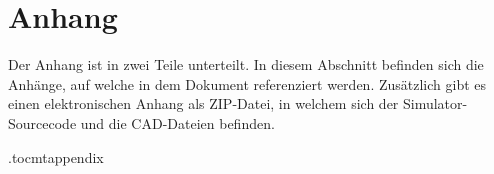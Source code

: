\documentclass[../main.tex]{subfiles}
\begin{document}
\newpage
\appendix
\chapter*{Anhang}

Der Anhang ist in zwei Teile unterteilt.
In diesem Abschnitt befinden sich die Anhänge, auf welche in dem Dokument referenziert werden.
Zusätzlich gibt es einen elektronischen Anhang als ZIP-Datei, in welchem sich der Simulator-Sourcecode und die CAD-Dateien befinden.

\renewcommand{\thesection}{A\arabic{section}}
\etocdepthtag.toc{mtappendix}
\addtableofcontents






% 
\end{document}
